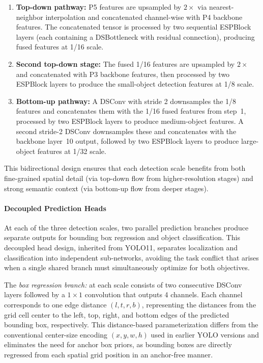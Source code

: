 \begin{enumerate}
    \item \textbf{Top-down pathway:} P5 features are upsampled by $2\times$ via nearest-neighbor interpolation and concatenated channel-wise with P4 backbone features. The concatenated tensor is processed by two sequential ESPBlock layers (each containing a DSBottleneck with residual connection), producing fused features at 1/16 scale.
    \item \textbf{Second top-down stage:} The fused 1/16 features are upsampled by $2\times$ and concatenated with P3 backbone features, then processed by two ESPBlock layers to produce the small-object detection features at 1/8 scale.
    \item \textbf{Bottom-up pathway:} A DSConv with stride 2 downsamples the 1/8 features and concatenates them with the 1/16 fused features from step~1, processed by two ESPBlock layers to produce medium-object features. A second stride-2 DSConv downsamples these and concatenates with the backbone layer~10 output, followed by two ESPBlock layers to produce large-object features at 1/32 scale.
\end{enumerate}

This bidirectional design ensures that each detection scale benefits from both fine-grained spatial detail (via top-down flow from higher-resolution stages) and strong semantic context (via bottom-up flow from deeper stages).

\paragraph{Decoupled Prediction Heads}
At each of the three detection scales, two parallel prediction branches produce separate outputs for bounding box regression and object classification. This decoupled head design, inherited from YOLO11, separates localization and classification into independent sub-networks, avoiding the task conflict that arises when a single shared branch must simultaneously optimize for both objectives.

The \textit{box regression branch:} at each scale consists of two consecutive DSConv layers followed by a $1 \times 1$ convolution that outputs 4 channels. Each channel corresponds to one edge distance $(l, t, r, b)$, representing the distances from the grid cell center to the left, top, right, and bottom edges of the predicted bounding box, respectively. This distance-based parameterization differs from the conventional center-size encoding $(x, y, w, h)$ used in earlier YOLO versions and eliminates the need for anchor box priors, as bounding boxes are directly regressed from each spatial grid position in an anchor-free manner.

